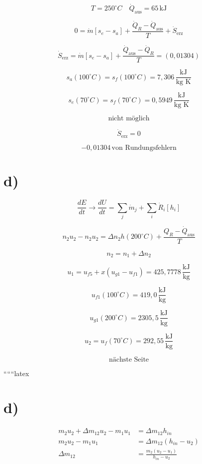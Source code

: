 \[
T = 250^\circ C \quad \dot{Q}_{\text{aus}} = 65 \, \text{kJ}
\]

\[
0 = \dot{m} \left[ s_e - s_a \right] + \frac{\dot{Q}_R - \dot{Q}_{\text{aus}}}{T} + \dot{S}_{\text{erz}}
\]

\[
\dot{S}_{\text{erz}} = \dot{m} \left[ s_e - s_a \right] + \frac{\dot{Q}_{\text{aus}} - \dot{Q}_R}{T} = (0,01304)
\]

\[
s_a (100^\circ C) = s_f (100^\circ C) = 7,306 \, \frac{\text{kJ}}{\text{kg K}}
\]

\[
s_e (70^\circ C) = s_f (70^\circ C) = 0,5949 \, \frac{\text{kJ}}{\text{kg K}}
\]

\[
\text{nicht möglich}
\]

\[
\dot{S}_{\text{erz}} = 0
\]

\[
-0,01304 \, \text{von Rundungsfehlern}
\]

\section*{d)}

\[
\frac{dE}{dt} \rightarrow \frac{dU}{dt} = \sum_j \dot{m}_j + \sum_i \dot{R}_i \left[ h_i \right]
\]

\[
n_2 u_2 - n_2 u_2 = \Delta n_2 h (200^\circ C) + \frac{Q_R - \dot{Q}_{\text{aus}}}{T}
\]

\[
n_2 = n_1 + \Delta n_2
\]

\[
u_1 = u_{f5} + x \left( u_{g1} - u_{f1} \right) = 425,7778 \, \frac{\text{kJ}}{\text{kg}}
\]

\[
u_{f1} (100^\circ C) = 419,0 \, \frac{\text{kJ}}{\text{kg}}
\]

\[
u_{g1} (200^\circ C) = 2305,5 \, \frac{\text{kJ}}{\text{kg}}
\]

\[
u_2 = u_f (70^\circ C) = 292,55 \, \frac{\text{kJ}}{\text{kg}}
\]

\[
\text{nächste Seite}
\]

``````latex


\section*{d)}

\begin{align*}
m_2 u_2 + \Delta m_{12} u_2 - m_1 u_1 &= \Delta m_{12} h_{in} \\
m_2 u_2 - m_1 u_1 &= \Delta m_{12} (h_{in} - u_2) \\
\Delta m_{12} &= \frac{m_2 (u_2 - u_1)}{h_{in} - u_2}
\end{align*}

